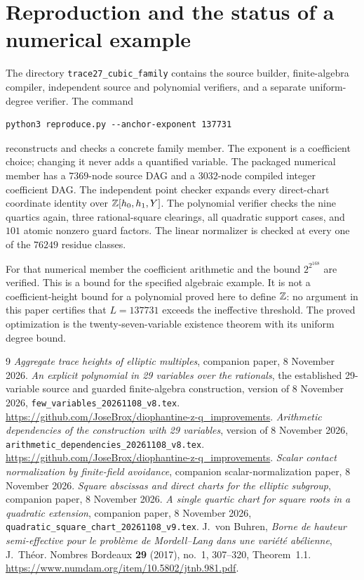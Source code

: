 \documentclass[11pt,a4paper]{article}
\begin{document}
\section{Reproduction and the status of a numerical example}

The directory \texttt{trace27\_cubic\_family} contains the source
builder, finite-algebra compiler, independent source and
polynomial verifiers, and a separate uniform-degree verifier.
The command
\begin{verbatim}
python3 reproduce.py --anchor-exponent 137731
\end{verbatim}
reconstructs and checks a concrete family member. The exponent
is a coefficient choice; changing it never adds a quantified
variable. The packaged numerical member has a $7369$-node
source DAG and a $3032$-node compiled integer coefficient DAG.
The independent point checker expands every direct-chart coordinate
identity over $\mathbb Z[h_0,h_1,Y]$. The polynomial verifier checks
the nine quartics again, three
rational-square clearings, all quadratic support cases, and
$101$ atomic nonzero guard factors. The linear normalizer is
checked at every one of the $76249$ residue classes.

For that numerical member the coefficient arithmetic and the
bound $2^{2^{168}}$ are verified. This is a bound for the
specified algebraic example. It is not a coefficient-height
bound for a polynomial proved here to define $\mathbb Z$: no argument
in this paper certifies that $L=137731$ exceeds the ineffective
threshold. The proved optimization is the twenty-seven-variable
existence theorem with its uniform degree bound.

\begin{thebibliography}{9}
\emph{Aggregate trace heights of elliptic multiples},
companion paper, 8 November 2026.
\emph{An explicit polynomial in 29 variables over the rationals},
the established 29-variable source and guarded finite-algebra
construction, version of 8 November 2026,
\nolinkurl{few_variables_20261108_v8.tex}.
\url{https://github.com/JoseBrox/diophantine-z-q_improvements}.
\emph{Arithmetic dependencies of the construction with 29 variables},
version of 8 November 2026,
\nolinkurl{arithmetic_dependencies_20261108_v8.tex}.
\url{https://github.com/JoseBrox/diophantine-z-q_improvements}.
\emph{Scalar contact normalization by finite-field avoidance},
companion scalar-normalization paper, 8 November 2026.
\emph{Square abscissas and direct charts for the elliptic subgroup},
companion paper, 8 November 2026.
\emph{A single quartic chart for square roots in a quadratic extension},
companion paper, 8 November 2026,
\nolinkurl{quadratic_square_chart_20261108_v9.tex}.
J.~von Buhren,
\emph{Borne de hauteur semi-effective pour le probl\`eme de
Mordell--Lang dans une vari\'et\'e ab\'elienne},
J.~Th\'eor. Nombres Bordeaux \textbf{29} (2017), no.~1,
307--320, Theorem~1.1.
\url{https://www.numdam.org/item/10.5802/jtnb.981.pdf}.
\end{thebibliography}
\end{document}
